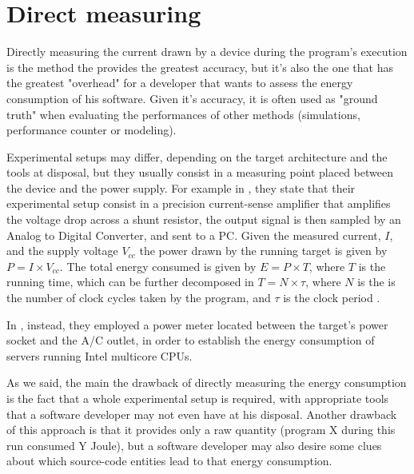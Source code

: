 \section{Direct measuring}

Directly measuring the current drawn by a device during the program's execution is the method the provides the greatest accuracy, but it's also the one that has the greatest "overhead" for a developer that wants to assess the energy consumption of his software. \newline 
Given it's accuracy, it is often used as "ground truth" when evaluating the performances of other methods (simulations, performance counter or modeling). 
\par Experimental setups may differ, depending on the target architecture and the tools at disposal, but they usually consist in a measuring point placed between the device and the power supply. For example in \cite{roth}, they state that their experimental setup consist in a precision current-sense amplifier that amplifies the voltage drop across a shunt resistor, the output signal is then sampled by an Analog to Digital Converter, and sent to a PC. \newline
Given the measured current, $I$, and the supply voltage $V_{cc}$ the power drawn by the running target is given by $P = I \times V_{cc}$. The total energy consumed is given by $E = P \times T$, where $T$ is the running time, which can be further decomposed in $T = N \times \tau$, where $N$ is the is the number of clock cycles taken by the program, and $\tau$ is the clock period \cite{tiwari}.
\par In \cite{fahad}, instead, they employed a power meter located between the target's power socket and the A/C outlet, in order to establish the energy consumption of servers running Intel multicore CPUs.
\par As we said, the main the drawback of directly measuring the energy consumption is the fact that a whole experimental setup is required, with appropriate tools that a software developer may not even have at his disposal. Another drawback of this approach is that it provides only a raw quantity (program X during this run consumed Y Joule), but a software developer may also desire some clues about which source-code entities lead to that energy consumption.

